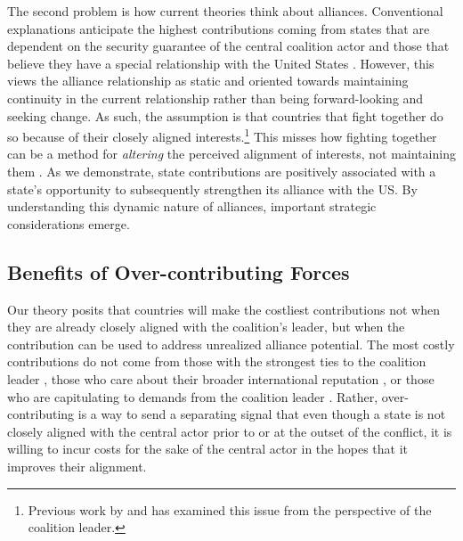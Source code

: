 \documentclass[12pt,letterpaper]{article}
\begin{document}
		The second problem is how current theories think about alliances. Conventional explanations anticipate the highest contributions coming from states that are dependent on the security guarantee of the central coalition actor and those that believe they have a special relationship with the United States \citep{graeger_revivalatlanticismnato_2009, biehl_strategiccultureseurope_2013, howorth_securitydefencepolicy_2014, haesebrouck_democraticparticipationair_2016}. However, this views the alliance relationship as static and oriented towards maintaining continuity in the current relationship rather than being forward-looking and seeking change. As such, the assumption is that countries that fight together do so because of their closely aligned interests.\footnote{Previous work by \citet{kreps_whendoesmission_2008} and \citet{henke_politicsdiplomacyhow_2017} has examined this issue from the perspective of the coalition leader.} This misses how fighting together can be a method for \textit{altering} the perceived alignment of interests, not maintaining them \citep{weitsman_wagingwaralliances_2013}. As we demonstrate, state contributions are positively associated with a state's opportunity to subsequently strengthen its alliance with the US. By understanding this dynamic nature of alliances, important strategic considerations emerge.
		
	\subsection{Benefits of Over-contributing Forces}
		Our theory posits that countries will make the costliest contributions not when they are already closely aligned with the coalition's leader, but when the contribution can be used to address unrealized alliance potential. The most costly contributions do not come from those with the strongest ties to the coalition leader \citep{ringsmose_natoburdensharingredux_2010, wolford_showing_2014}, those who care about their broader international reputation \citep{pedersen_bandwagonstatuschanging_2018}, or those who are capitulating to demands from the coalition leader \citep{schweller_newrealistresearch_1997}. Rather, over-contributing is a way to send a separating signal that even though a state is not closely aligned with the central actor prior to or at the outset of the conflict, it is willing to incur costs for the sake of the central actor in the hopes that it improves their alignment.
\end{document}

